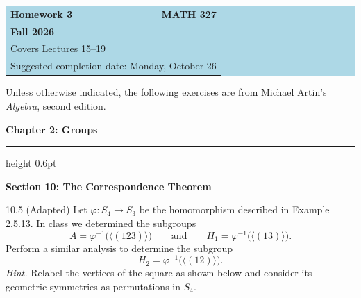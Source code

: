 \documentclass[11pt]{article}
\newcommand{\chapterheading}[1]{%
  \par\vspace{0.5em}
  {\color{courseblue}\Large\bfseries #1}\par\vspace{0.35em}
  {\color{boxborder}\hrule height 0.6pt}\vspace{0.35em}
}
\newcommand{\sectionheading}[1]{%
  \Needspace{8\baselineskip}
  \vspace{0.25em}
  {\color{darkgray}\large\bfseries #1}\par
}
\begin{document}
\begin{center}
  \colorbox{lightblue}{%
    \begin{minipage}{0.92\textwidth}
      \vspace{0.6em}
      \begin{tabular*}{\textwidth}{@{\extracolsep{\fill}}lr}
        {\color{courseblue}\bfseries\LARGE Homework 3} &
        {\color{courseblue}\bfseries\LARGE MATH 327}\\[0.4em]
        \multicolumn{2}{l}{\color{darkgray}\bfseries Fall 2026}\\[0.35em]
        \multicolumn{2}{l}{\color{darkgray}Covers Lectures 15--19}\\[0.2em]
        \multicolumn{2}{l}{\color{darkgray}Suggested completion date: Monday, October 26}
      \end{tabular*}
      \vspace{0.5em}
    \end{minipage}}
\end{center}

\vspace{0.5em}

Unless otherwise indicated, the following exercises are from Michael Artin's
\emph{Algebra}, second edition.

\chapterheading{Chapter 2: Groups}

\sectionheading{Section 10: The Correspondence Theorem}

\begin{exercise}{10.5 (Adapted)}
Let $\varphi\colon S_4\to S_3$ be the homomorphism described in
Example 2.5.13. In class we determined the subgroups
\[
  A=\varphi^{-1}\bigl(\langle(123)\rangle\bigr)
  \qquad\text{and}\qquad
  H_1=\varphi^{-1}\bigl(\langle(13)\rangle\bigr).
\]
Perform a similar analysis to determine the subgroup
\[
  H_2=\varphi^{-1}\bigl(\langle(12)\rangle\bigr).
\]
\textit{Hint.} Relabel the vertices of the square as shown below and
consider its geometric symmetries as permutations in $S_4$.
\begin{center}
\end{center}
\end{exercise}
\end{document}
